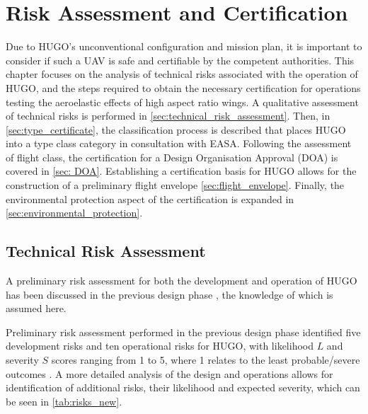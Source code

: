 \chapter{Risk Assessment and Certification}
\label{ch:certification}

Due to HUGO's unconventional configuration and mission plan, it is important to consider if such a UAV is safe and certifiable by the competent authorities. This chapter focuses on the analysis of technical risks associated with the operation of HUGO, and the steps required to obtain the necessary certification for operations testing the aeroelastic effects of high aspect ratio wings. A qualitative assessment of technical risks is performed in \autoref{sec:technical_risk_assessment}. Then, in \autoref{sec:type_certificate}, the classification process is described that places HUGO into a type class category in consultation with EASA. Following the assessment of flight class, the certification for a Design Organisation Approval (DOA) is covered in \autoref{sec: DOA}. Establishing a certification basis for HUGO allows for the construction of a preliminary flight envelope \autoref{sec:flight_envelope}. Finally, the environmental protection aspect of the certification is expanded in \autoref{sec:environmental_protection}.


\section{Technical Risk Assessment}
\label{sec:technical_risk_assessment}
A preliminary risk assessment for both the development and operation of HUGO has been discussed in the previous design phase , the knowledge of which is assumed here. 

Preliminary risk assessment performed in the previous design phase identified five development risks and ten operational risks for HUGO, with likelihood $L$ and severity $S$ scores ranging from 1 to 5, where 1 relates to the least probable/severe outcomes . A more detailed analysis of the design and operations allows for identification of additional risks, their likelihood and expected severity, which can be seen in \autoref{tab:risks_new}.




